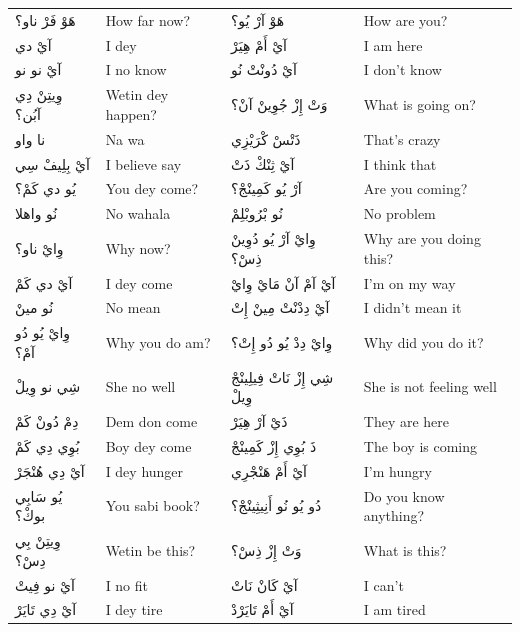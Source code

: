 \documentclass[12pt]{article}
\begin{document}
\begin{longtable}{A p{3.2cm} A p{3.2cm}}
هَوْ فَرْ ناو؟ & How far now? & هَوْ آرْ يُو؟ & How are you? \\
آيْ دي & I dey & آيْ أَمْ هِيَرْ & I am here \\
آيْ نو نو & I no know & آيْ دُونْتْ نُو & I don't know \\
وِيتِنْ دِي آبُن؟ & Wetin dey happen? & وَتْ إِزْ جُوِينْ آنْ؟ & What is going on? \\
نا واو & Na wa & ذَتْسْ كْرَيْزِي & That’s crazy \\
آيْ بِلِيفْ سِي & I believe say & آيْ ثِنْكْ ذَتْ & I think that \\
يُو دي كَمْ؟ & You dey come? & آرْ يُو كَمِينْجْ؟ & Are you coming? \\
نُو واهلا & No wahala & نُو بْرُوبْلِمْ & No problem \\
وِايْ ناو؟ & Why now? & وِايْ آرْ يُو دُوِينْ ذِسْ؟ & Why are you doing this? \\
آيْ دي كَمْ & I dey come & آيْ آمْ آنْ مَايْ وِايْ & I’m on my way \\
نُو مينْ & No mean & آيْ دِدْنْتْ مِينْ إِتْ & I didn’t mean it \\
وِايْ يُو دُو آمْ؟ & Why you do am? & وِايْ دِدْ يُو دُو إِتْ؟ & Why did you do it? \\
شِي نو وِيلْ & She no well & شِي إِزْ نَاتْ فِيلِينْجْ وِيلْ & She is not feeling well \\
دِمْ دُونْ كَمْ & Dem don come & ذَيْ آرْ هِيَرْ & They are here \\
بُوِي دِي كَمْ & Boy dey come & ذَ بُوِي إِزْ كَمِينْجْ & The boy is coming \\
آيْ دِي هُنْجَرْ & I dey hunger & آيْ أَمْ هَنْجْرِي & I’m hungry \\
يُو سَابِي بوكْ؟ & You sabi book? & دُو يُو نُو أَنِيثِينْجْ؟ & Do you know anything? \\
وِيتِنْ بِي دِسْ؟ & Wetin be this? & وَتْ إِزْ ذِسْ؟ & What is this? \\
آيْ نو فِيتْ & I no fit & آيْ كَانْ نَاتْ & I can’t \\
آيْ دِي تَايَرْ & I dey tire & آيْ أَمْ تَايَرْدْ & I am tired \\


\end{longtable}
\end{document}
